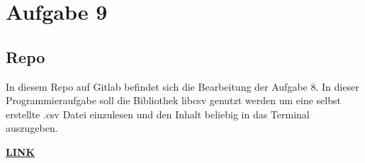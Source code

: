 \chapter{Aufgabe 9}
\section{Repo}
In diesem Repo auf Gitlab befindet sich die Bearbeitung der Aufgabe 8.
In dieser Programmieraufgabe soll die Bibliothek libcsv genutzt werden um eine selbst erstellte .csv Datei einzulesen und den Inhalt beliebig in das Terminal auszugeben.
\par
\href{https://gitlab.thga.de/daniel.krueger/pruefung_sose_2023_aufgabe_8_csv}{\textbf{LINK}}
